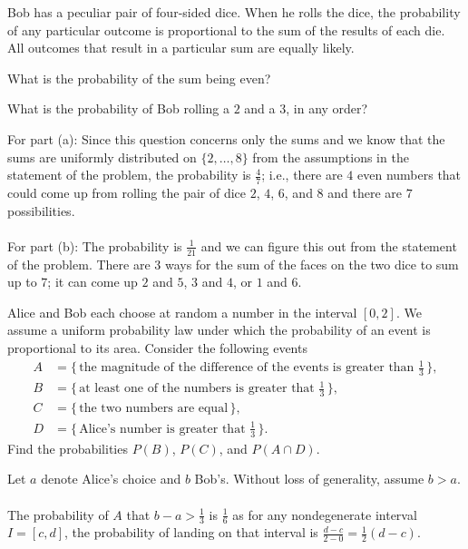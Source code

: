 \begin{problem}
  Bob has a peculiar pair of four-sided dice. When he rolls the dice, the
  probability of any particular outcome is proportional to the sum of the
  results of each die. All outcomes that result in a particular sum are
  equally likely.
  \begin{alphlist}
  \item What is the probability of the sum being even?
  \item What is the probability of Bob rolling a \(2\) and a \(3\), in any
    order?
  \end{alphlist}
\end{problem}
\begin{solution*}
  For part (a): Since this question concerns only the sums and we know that
  the sums are uniformly distributed on \(\{2,\dotsc,8\}\) from the
  assumptions in the statement of the problem, the probability is
  \(\frac{4}{7}\); i.e., there are \(4\) even numbers that could come up
  from rolling the pair of dice \(2\), \(4\), \(6\), and \(8\) and there
  are \(7\) possibilities.
  \\\\
  For part (b): The probability is \(\frac{1}{21}\) and we can figure this
  out from the statement of the problem. There are \(3\) ways for the sum
  of the faces on the two dice to sum up to \(7\); it can come up \(2\) and
  \(5\), \(3\) and \(4\), or \(1\) and \(6\).
\end{solution*}

\begin{problem}
  Alice and Bob each choose at random a number in the interval
  \([0,2]\). We assume a uniform probability law under which the
  probability of an event is proportional to its area. Consider the
  following events
  \begin{align*}
    A&=\bigl\{\,\text{the magnitude of the difference of the events is
       greater than \(\tfrac{1}{3}\)}\,\bigr\},\\
    B&=\bigl\{\,\text{at least one of the numbers is greater that
       \(\tfrac{1}{3}\)}\,\bigr\},\\
    C&=\bigl\{\,\text{the two numbers are equal}\,\bigr\},\\
    D&=\bigl\{\,\text{Alice's number is greater that \(\tfrac{1}{3}\)}\,\bigr\}.
  \end{align*}
  Find the probabilities \(P(B)\), \(P(C)\), and \(P(A\cap D)\).
\end{problem}
\begin{solution*}
  Let \(a\) denote Alice's choice and \(b\) Bob's. Without loss of
  generality, assume \(b>a\).
  \\\\
  The probability of \(A\) that \(b-a>\frac{1}{3}\) is \(\frac{1}{6}\) as
  for any nondegenerate interval \(I=[c,d]\), the probability of landing on
  that interval is \(\frac{d-c}{2-0}=\frac{1}{2}(d-c)\).

\end{solution*}

